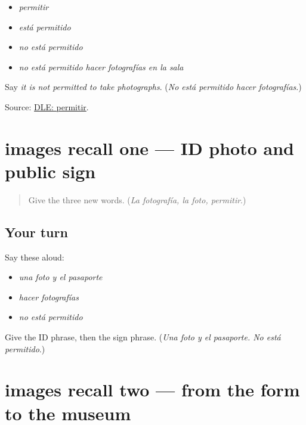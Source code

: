 \begin{itemize}
\raggedright
  \item \emph{permitir}
  \item \emph{está permitido}
  \item \emph{no está permitido}
  \item \emph{no está permitido hacer fotografías en la sala}
\end{itemize}

\begin{tcolorbox}[breakable,colback=teal!4,colframe=teal!35!black,title={Before you move on}]
Say \emph{it is not permitted to take photographs}. (\emph{No está permitido hacer fotografías}.)

Source: \href{https://dle.rae.es/permitir}{DLE: permitir}.
\end{tcolorbox}
\section[(review)]{images recall one — ID photo and public sign}

\label{lesson:ES-C405-images-recall-1}



\begin{quote}
Give the three new words. (\emph{La fotografía, la foto, permitir}.)
\end{quote}

\subsection*{Your turn}
Say these aloud:

\begin{itemize}
\raggedright
  \item \emph{una foto y el pasaporte}
  \item \emph{hacer fotografías}
  \item \emph{no está permitido}
\end{itemize}

\begin{tcolorbox}[breakable,colback=teal!4,colframe=teal!35!black,title={Before you move on}]
Give the ID phrase, then the sign phrase. (\emph{Una foto y el pasaporte. No está permitido}.)
\end{tcolorbox}
\section[(review)]{images recall two — from the form to the museum}

